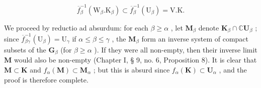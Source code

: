 \[
\overline {{f}} _ {\beta} ^ {-1} (\mathrm{W} _ {\beta}. \mathrm{K} _ {\beta}) \subset \overline {{f}} _ {\beta} ^ {-1} (\mathrm{U} _ {\beta}) = \mathrm{V}. \mathrm{K}.
\]

We proceed by reductio ad absurdum: for each \(\beta \geqslant \alpha\) , let \(\mathbf{M}_{\beta}\) denote \(\mathbf{K}_{\beta} \cap \mathbb{C}\mathbf{U}_{\beta}\) ; since \(\overline{f}_{\beta \gamma}^{-1}(\mathrm{U}_{\beta}) = \mathrm{U}_{\gamma}\) if \(\alpha \leqslant \beta \leqslant \gamma\) , the \(\mathbf{M}_{\beta}\) form an inverse system of compact subsets of the \(\mathbf{G}_{\beta}\) (for \(\beta \geqslant \alpha\) ). If they were all non-empty, then their inverse limit \(\mathbf{M}\) would also be non-empty (Chapter I, § 9, no. 6, Proposition 8). It is clear that \(\mathbf{M} \subset \mathbf{K}\) and \(f_{\alpha}(\mathbf{M}) \subset \mathbf{M}_{\alpha}\) ; but this is absurd since \(f_{\alpha}(\mathbf{K}) \subset \mathbf{U}_{\alpha}\) , and the proof is therefore complete.

